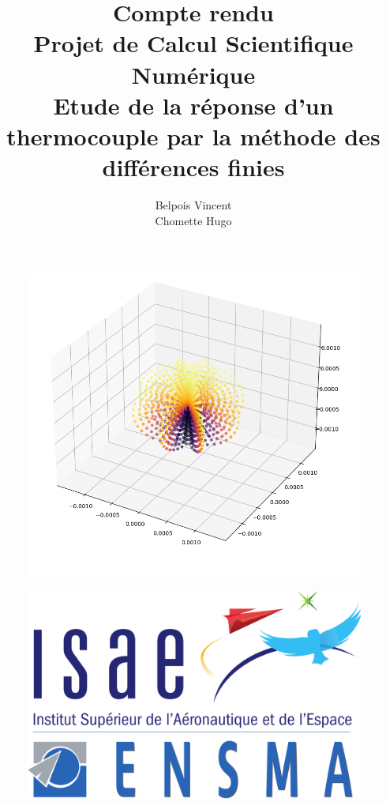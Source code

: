 \documentclass[fleqn]{article}
\title{Compte rendu\\ Projet de Calcul Scientifique Numérique \\ Etude de la réponse d'un thermocouple par la méthode des différences finies}
\author{Belpois Vincent \\ Chomette Hugo}
\date{}
\begin{document}
\maketitle

\begin{figure}[H]
    \centering
    \includegraphics[width = 0.5\paperwidth]{images/Page de garde.png}
\end{figure}
\vspace{10pt}
\begin{figure}[H]
    \centering
    \includegraphics[width = 0.25\paperwidth]{images/Logo_ISAE-ENSMA.svg.png}
\end{figure}
\end{document}
